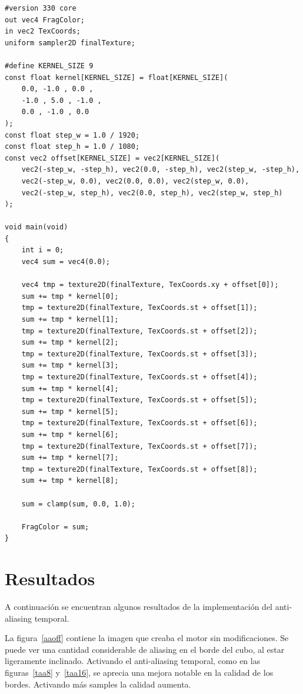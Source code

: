 \documentclass[withindex, glossary]{cam-thesis}
\begin{document}
\begin{verbatim}
#version 330 core
out vec4 FragColor;
in vec2 TexCoords;
uniform sampler2D finalTexture;

#define KERNEL_SIZE 9
const float kernel[KERNEL_SIZE] = float[KERNEL_SIZE](
    0.0, -1.0 , 0.0 ,
    -1.0 , 5.0 , -1.0 ,
    0.0 , -1.0 , 0.0
);
const float step_w = 1.0 / 1920;
const float step_h = 1.0 / 1080;
const vec2 offset[KERNEL_SIZE] = vec2[KERNEL_SIZE](
    vec2(-step_w, -step_h), vec2(0.0, -step_h), vec2(step_w, -step_h),
    vec2(-step_w, 0.0), vec2(0.0, 0.0), vec2(step_w, 0.0),
    vec2(-step_w, step_h), vec2(0.0, step_h), vec2(step_w, step_h)
);

void main(void)
{
    int i = 0;
    vec4 sum = vec4(0.0);

    vec4 tmp = texture2D(finalTexture, TexCoords.xy + offset[0]);
    sum += tmp * kernel[0];
    tmp = texture2D(finalTexture, TexCoords.st + offset[1]);
    sum += tmp * kernel[1];
    tmp = texture2D(finalTexture, TexCoords.st + offset[2]);
    sum += tmp * kernel[2];
    tmp = texture2D(finalTexture, TexCoords.st + offset[3]);
    sum += tmp * kernel[3];
    tmp = texture2D(finalTexture, TexCoords.st + offset[4]);
    sum += tmp * kernel[4];
    tmp = texture2D(finalTexture, TexCoords.st + offset[5]);
    sum += tmp * kernel[5];
    tmp = texture2D(finalTexture, TexCoords.st + offset[6]);
    sum += tmp * kernel[6];
    tmp = texture2D(finalTexture, TexCoords.st + offset[7]);
    sum += tmp * kernel[7];
    tmp = texture2D(finalTexture, TexCoords.st + offset[8]);
    sum += tmp * kernel[8];

    sum = clamp(sum, 0.0, 1.0);

    FragColor = sum;
}
\end{verbatim}

\chapter{Resultados}

A continuación se encuentran algunos resultados de la implementación del anti-aliasing temporal.

La figura~\ref{aaoff} contiene la imagen que creaba el motor sin modificaciones. Se puede ver una cantidad considerable de aliasing en el borde del cubo, al estar ligeramente inclinado. Activando el anti-aliasing temporal, como en las figuras~\ref{taa8} y~\ref{taa16}, se aprecia una mejora notable en la calidad de los bordes. Activando más samples la calidad aumenta.
\end{document}
